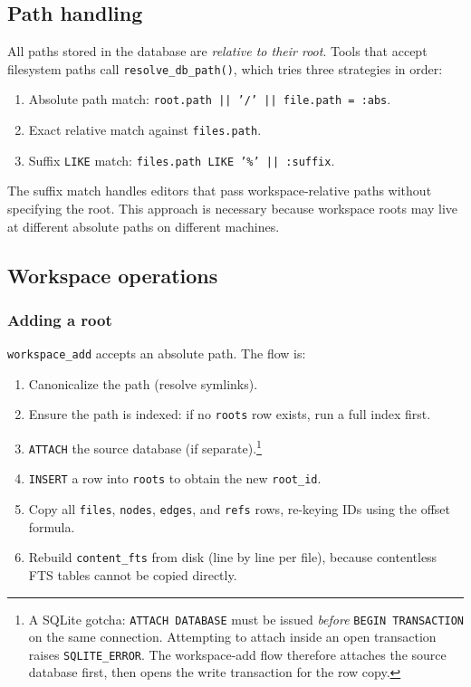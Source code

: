 \subsection{Path handling}

All paths stored in the database are \emph{relative to their root}. Tools that
accept filesystem paths call \texttt{resolve\_db\_path()}, which tries three
strategies in order:
\begin{enumerate}
  \item Absolute path match: \texttt{root.path || '/' || file.path = :abs}.
  \item Exact relative match against \texttt{files.path}.
  \item Suffix \texttt{LIKE} match: \texttt{files.path LIKE '\%' || :suffix}.
\end{enumerate}
The suffix match handles editors that pass workspace-relative paths without
specifying the root. This approach is necessary because workspace roots may
live at different absolute paths on different machines.

\subsection{Workspace operations}

\subsubsection{Adding a root}

\texttt{workspace\_add} accepts an absolute path. The flow is:
\begin{enumerate}
  \item Canonicalize the path (resolve symlinks).
  \item Ensure the path is indexed: if no \texttt{roots} row exists, run a
        full index first.
  \item \texttt{ATTACH} the source database (if separate).\footnote{A SQLite
        gotcha: \texttt{ATTACH DATABASE} must be issued \emph{before}
        \texttt{BEGIN TRANSACTION} on the same connection. Attempting to
        attach inside an open transaction raises \texttt{SQLITE\_ERROR}. The
        workspace-add flow therefore attaches the source database first, then
        opens the write transaction for the row copy.}
  \item \texttt{INSERT} a row into \texttt{roots} to obtain the new
        \texttt{root\_id}.
  \item Copy all \texttt{files}, \texttt{nodes}, \texttt{edges}, and
        \texttt{refs} rows, re-keying IDs using the offset formula.
  \item Rebuild \texttt{content\_fts} from disk (line by line per file),
        because contentless FTS tables cannot be copied directly.
\end{enumerate}

